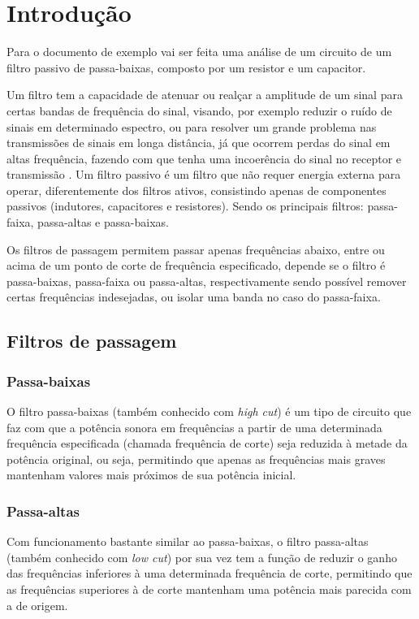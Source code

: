 \section{Introdução}
  Para o documento de exemplo vai ser feita uma análise de um circuito de um filtro passivo de passa-baixas, composto por um resistor e um capacitor.

  Um filtro tem a capacidade de atenuar ou realçar a amplitude de um sinal para certas bandas de frequência do sinal, visando, por exemplo reduzir o ruído de sinais em determinado espectro, ou para resolver um grande problema nas transmissões de sinais em longa distância, já que ocorrem perdas do sinal em altas frequência, fazendo com
  que tenha uma incoerência do sinal no receptor e transmissão \cite{ref:all_about_audio}. Um filtro passivo é um filtro que não requer energia externa para operar, diferentemente dos filtros ativos, consistindo apenas de componentes passivos (indutores, capacitores e resistores). Sendo os principais filtros: passa-faixa, passa-altas e passa-baixas.

  Os filtros de passagem permitem passar apenas frequências abaixo, entre ou acima de
  um ponto de corte de frequência especificado, depende se o filtro é passa-baixas, passa-faixa ou passa-altas, respectivamente sendo possível remover certas frequências indesejadas, ou isolar uma banda no caso do passa-faixa.

  \subsection{Filtros de passagem}
    \subsubsection{Passa-baixas}
      O filtro passa-baixas (também conhecido com \textit{high cut}) é um tipo de circuito que faz com que a potência sonora em frequências a partir de uma determinada frequência especificada (chamada frequência de corte) seja reduzida à metade da potência original, ou seja, permitindo que apenas as frequências mais graves mantenham valores mais próximos de sua potência inicial.

    \subsubsection{Passa-altas}
      Com funcionamento bastante similar ao passa-baixas, o filtro passa-altas (também conhecido com \textit{low cut}) por sua vez tem a função de reduzir o ganho das frequências inferiores à uma determinada frequência de corte, permitindo que as frequências superiores à de corte mantenham uma potência mais parecida com a de origem.

